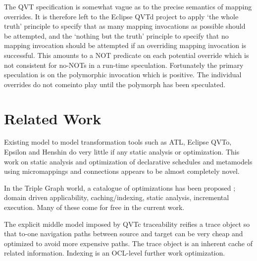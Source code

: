 \documentclass{jot}
\begin{document}
The QVT specification is somewhat vague as to the precise semantics of mapping overrides. It is therefore left to the Eclipse QVTd project to apply `the whole truth' principle to specify that as many mapping invocations as possible should be attempted, and the `nothing but the truth' principle to specify that no mapping invocation should be attempted if an overriding mapping invocation is successful. This amounts to a NOT predicate on each potential override which is not consistent for no-NOTs in a run-time speculation. Fortunately the primary speculation is on the polymorphic invocation which is positive. The  individual overrides do not comeinto play until the polymorph has been speculated.



\section{Related Work}\label{Related Work}

Existing model to model transformation tools such as ATL, Eclipse QVTo, Epsilon and Henshin \cite{Eclipse-Henshin} do very little if any static analysis or optimization. This work on static analysis and optimization of declarative schedules and metamodels using micromappings and connections appears to be almost completely novel. 

In the Triple Graph world, a catalogue of optimizations has been proposed \cite{TGG-Optimization}; domain driven applicability, caching/indexing, static analysis, incremental execution. Many of these come for free in the current work.

The explicit middle model imposed by QVTc traceability reifies a trace object so that to-one navigation paths between source and target can be very cheap and optimized to avoid more expensive paths.
The trace object is an inherent cache of related information. Indexing is an OCL-level further work optimization. 
\end{document}
